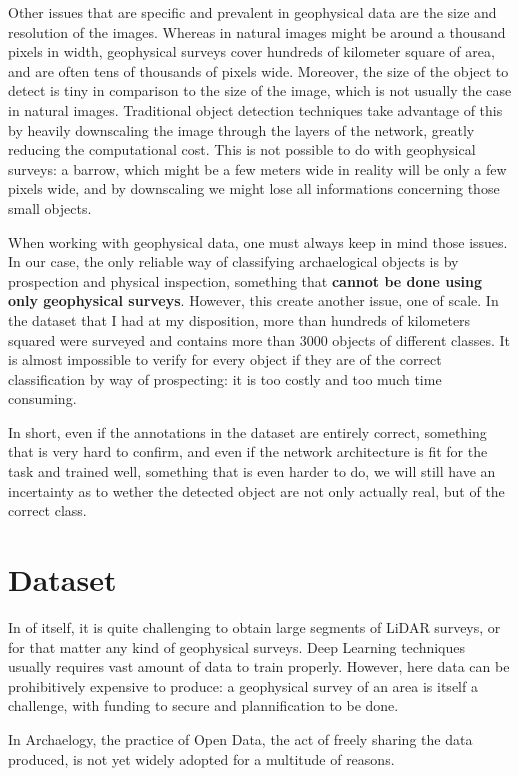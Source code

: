 Other issues that are specific and prevalent in geophysical data are the size and resolution of the images. Whereas in natural images might be around a thousand pixels in width, geophysical surveys cover hundreds of kilometer square of area, and are often tens of thousands of pixels wide. Moreover, the size of the object to detect is tiny in comparison to the size of the image, which is not usually the case in natural images. Traditional object detection techniques take advantage of this by heavily downscaling the image through the layers of the network, greatly reducing the computational cost. This is not possible to do with geophysical surveys: a barrow, which might be a few meters wide in reality will be only a few pixels wide, and by downscaling we might lose all informations concerning those small objects. 

When working with geophysical data, one must always keep in mind those issues. In our case, the only reliable way of classifying archaelogical objects is by prospection and physical inspection, something that \textbf{cannot be done using only geophysical surveys}. However, this create another issue, one of scale. In the dataset that I had at my disposition, more than hundreds of kilometers squared were surveyed and contains more than 3000 objects of different classes. It is almost impossible to verify for every object if they are of the correct classification by way of prospecting: it is too costly and too much time consuming. 

In short, even if the annotations in the dataset are entirely correct, something that is very hard to confirm, and even if the network architecture is fit for the task and trained well, something that is even harder to do, we will still have an incertainty as to wether the detected object are not only actually real, but of the correct class. 

\section{Dataset}\label{diffDataset}
In of itself, it is quite challenging to obtain large segments of LiDAR surveys, or for that matter any kind of geophysical surveys. Deep Learning techniques usually requires vast amount of data to train properly. However, here  data can be prohibitively expensive to produce: a geophysical survey of an area is itself a challenge, with funding to secure and plannification to be done. 

In Archaelogy, the practice of Open Data, the act of freely sharing the data produced, is not yet widely adopted for a multitude of reasons. 

